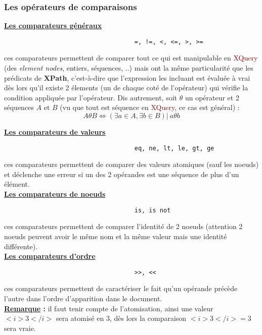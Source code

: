 \documentclass{article}
\newcommand{\red}[1]{\textcolor{darkred}{#1}}
\newcommand{\stitre}[1]{\noindent\textbf{\underline{#1}}}
\begin{document}
\subsubsection{Les opérateurs de comparaisons}
\stitre{Les comparateurs généraux}
\begin{verbatim}
                                    =, !=, <, <=, >, >=
\end{verbatim}
ces comparateurs permettent de comparer tout ce qui est manipulable en \red{XQuery} (des \textit{element nodes}, entiers, séquences, ..) mais ont la même particularité que les
prédicats de \textbf{XPath}, c'est-à-dire que l'expression les incluant est évaluée à vrai dès lors qu'il existe 2 élements (un de chaque coté de l'opérateur) qui vérifie la condition
appliquée par l'opérateur. Dis autrement, soit $\theta$ un opérateur et 2 séquences $A$ et $B$ (vu que tout est séquence en \red{XQuery}, ce cas est général) :
\[ A\theta B \Leftrightarrow \left(\exists  a\in A, \exists b \in B\right) |\ a\theta b\]

\stitre{Les comparateurs de valeurs}
\begin{verbatim}
                                    eq, ne, lt, le, gt, ge
\end{verbatim}
ces comparateurs permettent de comparer des valeurs atomiques (sauf les noeuds) et déclenche une erreur si un des 2 opérandes est une séquence de plus d'un élément.\\

\stitre{Les comparateurs de noeuds}
\begin{verbatim}
                                    is, is not
\end{verbatim}
ces comparateurs permettent de comparer l'identité de 2 noeuds (attention 2 noeuds peuvent avoir le même nom et la même valeur mais une identité différente).\\

\stitre{Les comparateurs d'ordre}
\begin{verbatim}
                                    >>, <<
\end{verbatim}
ces comparateurs permettent de caractériser le fait qu'un opérande précède l'autre dans l'ordre d'apparition dans le document. \\

\noindent \textbf{\underline{Remarque} :} il faut tenir compte de l'atomisation, ainsi une valeur $<i>3</i>$ sera atomisé en $3$, dès lors la comparaison $<i>3</i> = 3$ sera vraie.
\\
\end{document}
